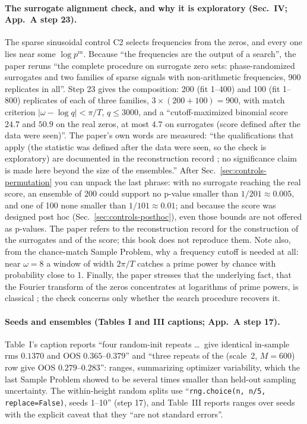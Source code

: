 \paragraph{The surrogate alignment check, and why it is exploratory (Sec.~IV; App.~A step 23).} The sparse sinusoidal control C2 selects frequencies from the zeros, and every one lies near some $\log p^m$. Because ``the frequencies are the output of a search'', the paper reruns ``the complete procedure on surrogate zero sets: phase-randomized surrogates and two families of sparse signals with non-arithmetic frequencies, 900 replicates in all''. Step 23 gives the composition: 200 (fit 1--400) and 100 (fit 1--800) replicates of each of three families, $3\times(200+100)=900$, with match criterion $|\omega-\log q|<\pi/T$, $q\le3000$, and a ``cutoff-maximized binomial score $24.7$ and $50.9$ on the real zeros, at most $4.7$ on surrogates (score defined after the data were seen)''. The paper's own words are measured: ``the qualifications that apply (the statistic was defined after the data were seen, so the check is exploratory) are documented in the reconstruction record \cite{zenodo}; no significance claim is made here beyond the size of the ensembles.'' After Sec.~\ref{sec:controls-permutation} you can unpack the last phrase: with no surrogate reaching the real score, an ensemble of 200 could support no p-value smaller than $1/201\approx0.005$, and one of 100 none smaller than $1/101\approx0.01$; and because the score was designed post hoc (Sec.~\ref{sec:controls-posthoc}), even those bounds are not offered as p-values. The paper refers to the reconstruction record for the construction of the surrogates and of the score; this book does not reproduce them. Note also, from the chance-match Sample Problem, why a frequency cutoff is needed at all: near $\omega=8$ a window of width $2\pi/T$ catches a prime power by chance with probability close to 1. Finally, the paper stresses that the underlying fact, that the Fourier transform of the zeros concentrates at logarithms of prime powers, is classical \cite{landau,gonek}; the check concerns only whether the search procedure recovers it.

\paragraph{Seeds and ensembles (Tables I and III captions; App.~A step 17).} Table~I's caption reports ``four random-init repeats \ldots\ give identical in-sample rms $0.1370$ and OOS $0.365$--$0.379$'' and ``three repeats of the (scale~2, $M=600$) row give OOS $0.279$--$0.283$'': ranges, summarizing optimizer variability, which the last Sample Problem showed to be several times smaller than held-out sampling uncertainty. The within-height random splits use ``\texttt{rng.choice(n, n/5, replace=False)}, seeds 1--10'' (step 17), and Table~III reports ranges over seeds with the explicit caveat that they ``are not standard errors''.

